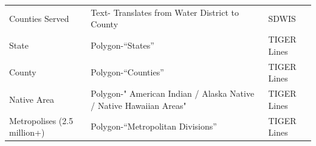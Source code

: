 \documentclass[
  12pt,
]{article}
\begin{document}
\begin{longtable}[]{@{}lll@{}}
\begin{minipage}[t]{0.24\columnwidth}\raggedright
Counties Served\strut
\end{minipage} & \begin{minipage}[t]{0.58\columnwidth}\raggedright
Text- Translates from Water District to County\strut
\end{minipage} & \begin{minipage}[t]{0.09\columnwidth}\raggedright
SDWIS\strut
\end{minipage}\tabularnewline
\begin{minipage}[t]{0.24\columnwidth}\raggedright
State\strut
\end{minipage} & \begin{minipage}[t]{0.58\columnwidth}\raggedright
Polygon-``States''\strut
\end{minipage} & \begin{minipage}[t]{0.09\columnwidth}\raggedright
TIGER Lines\strut
\end{minipage}\tabularnewline
\begin{minipage}[t]{0.24\columnwidth}\raggedright
County\strut
\end{minipage} & \begin{minipage}[t]{0.58\columnwidth}\raggedright
Polygon-``Counties''\strut
\end{minipage} & \begin{minipage}[t]{0.09\columnwidth}\raggedright
TIGER Lines\strut
\end{minipage}\tabularnewline
\begin{minipage}[t]{0.24\columnwidth}\raggedright
Native Area\strut
\end{minipage} & \begin{minipage}[t]{0.58\columnwidth}\raggedright
Polygon-" American Indian / Alaska Native / Native Hawaiian Areas"\strut
\end{minipage} & \begin{minipage}[t]{0.09\columnwidth}\raggedright
TIGER Lines\strut
\end{minipage}\tabularnewline
\begin{minipage}[t]{0.24\columnwidth}\raggedright
Metropolises (2.5 million+)\strut
\end{minipage} & \begin{minipage}[t]{0.58\columnwidth}\raggedright
Polygon-``Metropolitan Divisions''\strut
\end{minipage} & \begin{minipage}[t]{0.09\columnwidth}\raggedright
TIGER Lines\strut

\end{minipage}
\end{longtable}
\end{document}

